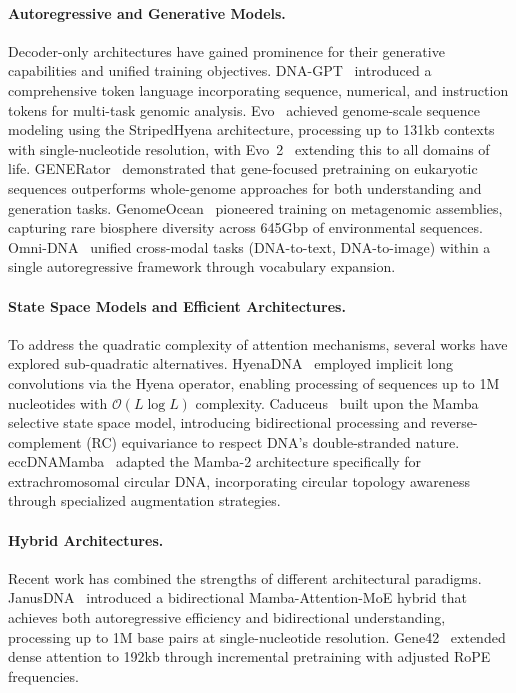 \documentclass{llmxive}
\begin{document}
\paragraph{Autoregressive and Generative Models.}
Decoder-only architectures have gained prominence for their generative capabilities and unified training objectives. DNA-GPT~\citep{zhang2023dnagptgeneralizedpretrainedtool} introduced a comprehensive token language incorporating sequence, numerical, and instruction tokens for multi-task genomic analysis. Evo~\citep{nguyen2024sequence} achieved genome-scale sequence modeling using the StripedHyena architecture, processing up to 131kb contexts with single-nucleotide resolution, with Evo~2~\citep{Brixi2025.02.18.638918} extending this to all domains of life. GENERator~\citep{wu2025generatorlongcontextgenerativegenomic} demonstrated that gene-focused pretraining on eukaryotic sequences outperforms whole-genome approaches for both understanding and generation tasks. GenomeOcean~\citep{Zhou2025.01.30.635558} pioneered training on metagenomic assemblies, capturing rare biosphere diversity across 645Gbp of environmental sequences. Omni-DNA~\citep{li2025omnidnaunifiedgenomicfoundation} unified cross-modal tasks (DNA-to-text, DNA-to-image) within a single autoregressive framework through vocabulary expansion.

\paragraph{State Space Models and Efficient Architectures.}
To address the quadratic complexity of attention mechanisms, several works have explored sub-quadratic alternatives. HyenaDNA~\citep{nguyen2023hyenadnalongrangegenomicsequence} employed implicit long convolutions via the Hyena operator, enabling processing of sequences up to 1M nucleotides with $\mathcal{O}(L\log L)$ complexity. Caduceus~\citep{schiff2024caduceusbidirectionalequivariantlongrange} built upon the Mamba selective state space model, introducing bidirectional processing and reverse-complement (RC) equivariance to respect DNA's double-stranded nature. eccDNAMamba~\citep{liu2025eccdnamambapretrainedmodelultralong} adapted the Mamba-2 architecture specifically for extrachromosomal circular DNA, incorporating circular topology awareness through specialized augmentation strategies.

\paragraph{Hybrid Architectures.}
Recent work has combined the strengths of different architectural paradigms. JanusDNA~\citep{duan2025janusdnapowerfulbidirectionalhybrid} introduced a bidirectional Mamba-Attention-MoE hybrid that achieves both autoregressive efficiency and bidirectional understanding, processing up to 1M base pairs at single-nucleotide resolution. Gene42~\citep{vishniakov2025gene42longrangegenomicfoundation} extended dense attention to 192kb through incremental pretraining with adjusted RoPE frequencies.
\end{document}
